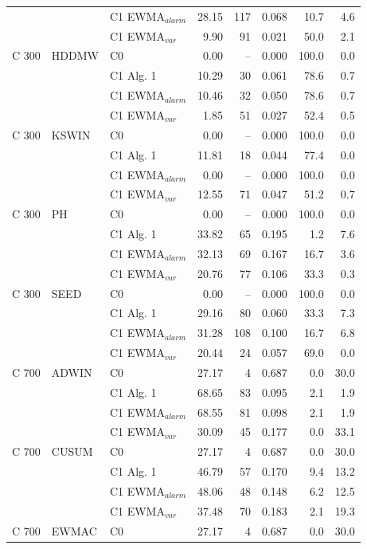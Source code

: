 \begin{longtable}{lllrrrrr}
 &  & C1 EWMA$_{alarm}$ & 28.15 & 117 & 0.068 & 10.7 & 4.6 \\
 &  & C1 EWMA$_{var}$ & 9.90 & 91 & 0.021 & 50.0 & 2.1 \\
\hline
C  300 & HDDMW & C0 & 0.00 & -- & 0.000 & 100.0 & 0.0 \\
 &  & C1 Alg. 1 & 10.29 & 30 & 0.061 & 78.6 & 0.7 \\
 &  & C1 EWMA$_{alarm}$ & 10.46 & 32 & 0.050 & 78.6 & 0.7 \\
 &  & C1 EWMA$_{var}$ & 1.85 & 51 & 0.027 & 52.4 & 0.5 \\
\hline
C  300 & KSWIN & C0 & 0.00 & -- & 0.000 & 100.0 & 0.0 \\
 &  & C1 Alg. 1 & 11.81 & 18 & 0.044 & 77.4 & 0.0 \\
 &  & C1 EWMA$_{alarm}$ & 0.00 & -- & 0.000 & 100.0 & 0.0 \\
 &  & C1 EWMA$_{var}$ & 12.55 & 71 & 0.047 & 51.2 & 0.7 \\
\hline
C  300 & PH & C0 & 0.00 & -- & 0.000 & 100.0 & 0.0 \\
 &  & C1 Alg. 1 & 33.82 & 65 & 0.195 & 1.2 & 7.6 \\
 &  & C1 EWMA$_{alarm}$ & 32.13 & 69 & 0.167 & 16.7 & 3.6 \\
 &  & C1 EWMA$_{var}$ & 20.76 & 77 & 0.106 & 33.3 & 0.3 \\
\hline
C  300 & SEED & C0 & 0.00 & -- & 0.000 & 100.0 & 0.0 \\
 &  & C1 Alg. 1 & 29.16 & 80 & 0.060 & 33.3 & 7.3 \\
 &  & C1 EWMA$_{alarm}$ & 31.28 & 108 & 0.100 & 16.7 & 6.8 \\
 &  & C1 EWMA$_{var}$ & 20.44 & 24 & 0.057 & 69.0 & 0.0 \\
\hline
C  700 & ADWIN & C0 & 27.17 & 4 & 0.687 & 0.0 & 30.0 \\
 &  & C1 Alg. 1 & 68.65 & 83 & 0.095 & 2.1 & 1.9 \\
 &  & C1 EWMA$_{alarm}$ & 68.55 & 81 & 0.098 & 2.1 & 1.9 \\
 &  & C1 EWMA$_{var}$ & 30.09 & 45 & 0.177 & 0.0 & 33.1 \\
\hline
C  700 & CUSUM & C0 & 27.17 & 4 & 0.687 & 0.0 & 30.0 \\
 &  & C1 Alg. 1 & 46.79 & 57 & 0.170 & 9.4 & 13.2 \\
 &  & C1 EWMA$_{alarm}$ & 48.06 & 48 & 0.148 & 6.2 & 12.5 \\
 &  & C1 EWMA$_{var}$ & 37.48 & 70 & 0.183 & 2.1 & 19.3 \\
\hline
C  700 & EWMAC & C0 & 27.17 & 4 & 0.687 & 0.0 & 30.0 \\

\end{longtable}
